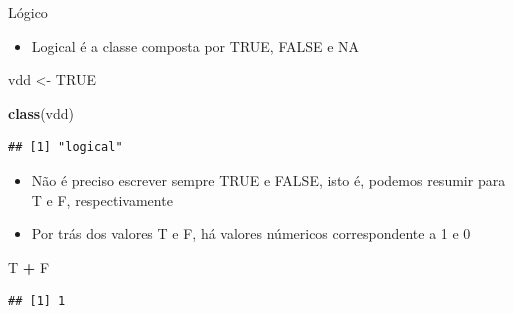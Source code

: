 \documentclass[
  10pt,
  ignorenonframetext,
]{beamer}
\newenvironment{Shaded}{\begin{snugshade}}{\end{snugshade}}
\newcommand{\KeywordTok}[1]{\textcolor[rgb]{0.13,0.29,0.53}{\textbf{#1}}}
\newcommand{\NormalTok}[1]{#1}
\newcommand{\OperatorTok}[1]{\textcolor[rgb]{0.81,0.36,0.00}{\textbf{#1}}}
\newcommand{\OtherTok}[1]{\textcolor[rgb]{0.56,0.35,0.01}{#1}}
\newcommand{\StringTok}[1]{\textcolor[rgb]{0.31,0.60,0.02}{#1}}
\providecommand{\tightlist}{%
  \setlength{\itemsep}{0pt}\setlength{\parskip}{0pt}}
\begin{document}
\begin{frame}[fragile]{Lógico}
\protect\hypertarget{luxf3gico}{}
\begin{itemize}
\tightlist
\item
  Logical é a classe composta por TRUE, FALSE e NA
\end{itemize}

\begin{Shaded}
\begin{Highlighting}[]
\NormalTok{vdd \textless{}{-}}\StringTok{ }\OtherTok{TRUE}

\KeywordTok{class}\NormalTok{(vdd)}
\end{Highlighting}
\end{Shaded}

\begin{verbatim}
## [1] "logical"
\end{verbatim}

\begin{itemize}
\item
  Não é preciso escrever sempre TRUE e FALSE, isto é, podemos resumir
  para T e F, respectivamente
\item
  Por trás dos valores T e F, há valores númericos correspondente a 1 e
  0
\end{itemize}

\begin{Shaded}
\begin{Highlighting}[]
\NormalTok{T }\OperatorTok{+}\StringTok{ }\NormalTok{F}
\end{Highlighting}
\end{Shaded}

\begin{verbatim}
## [1] 1
\end{verbatim}
\end{frame}
\end{document}
